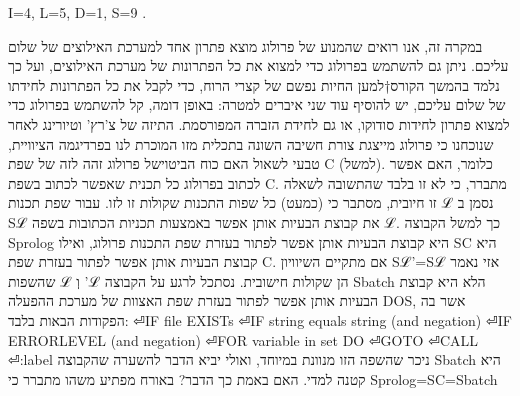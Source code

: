 \begin{טבלא}[!htbp]
      I=4,
      L=5,
      D=1,
      S=9 .

      במקרה זה, אנו רואים שהמנוע של פרולוג מוצא פתרון אחד למערכת האילוצים של
      שלום עליכם. ניתן גם להשתמש בפרולוג כדי למצוא את כל הפתרונות של מערכת
      האילוצים, ועל
      כך נלמד בהמשך הקורס†{למען החיות נפשם של קצרי הרוח, כדי לקבל את כל הפתרונות לחידתו של שלום עליכם, יש להוסיף עוד שני איברים למטרה:}
      באופן דומה, קל להשתמש בפרולוג כדי למצוא
      פתרון לחידות סודוקו, או גם לחידת הזברה המפורסמת. התיזה של צ'רץ' וטיורינג
      לאחר שנוכחנו כי פרולוג מייצגת צורת חשיבה השונה בתכלית מזו המוכרת לנו
      בפרדיגמה הציוויית, טבעי לשאול האם כוח הביטוישל פרולוג זהה לזה של שפת C
      (למשל). כלומר,
      האם אפשר לכתוב בפרולוג כל תכנית שאפשר לכתוב בשפת C. מתברר, כי לא זו בלבד
      שהתשובה לשאלה זו חיובית, מסתבר כי (כמעט) כל שפות התכנות שקולות זו לזו. עבור
      שפת תכנות ℒ נסמן ב Sℒ את קבוצת הבעיות אותן אפשר באמצעות תכניות הכתובות
      בשפה ℒ. כך למשל הקבוצה Sprolog היא קבוצת הבעיות אותן אפשר לפתור בעזרת שפת
      התכנות פרולוג, ואילו SC היא קבוצת הבעיות אותן אפשר לפתור בעזרת שפת C. אם
      מתקיים השיוויון Sℒ'=Sℒ אזי נאמר שהשפות ℒ וְ 'ℒ הן שקולות חישובית.
      נסתכל לרגע על הקבוצה Sbatch הלא היא קבוצת הבעיות אותן אפשר לפתור בעזרת שפת האצוות של מערכת ההפעלה DOS, אשר בה הפקודות הבאות בלבד:
⏎IF file EXISTs
⏎IF string equals string (and negation)
⏎IF ERRORLEVEL (and negation)
⏎FOR variable in set DO
⏎GOTO
⏎CALL
⏎:label
      ניכר שהשפה הזו מנוונת במיוחד, ואולי יביא הדבר להשערה שהקבוצה Sbatch היא
      קטנה למדי. האם באמת כך הדבר? באורח מפתיע משהו מתברר כי
      Sprolog=SC=Sbatch


\end{טבלא}

